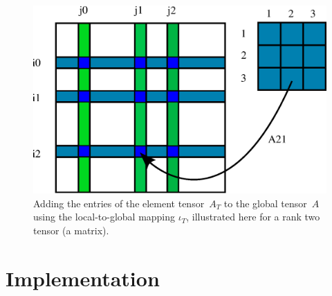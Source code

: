 \begin{figure}
  \begin{center}
    \includegraphics[width=12cm]{chapters/logg-3/eps/insertion.eps}
    \caption{Adding the entries of the element tensor~$A_T$ to the
      global tensor~$A$ using the  local-to-global mapping
      $\iota_T$, illustrated here for a rank two
      tensor (a matrix).}
    \label{fig:insertion}
  \end{center}
\end{figure}

\section{Implementation}

